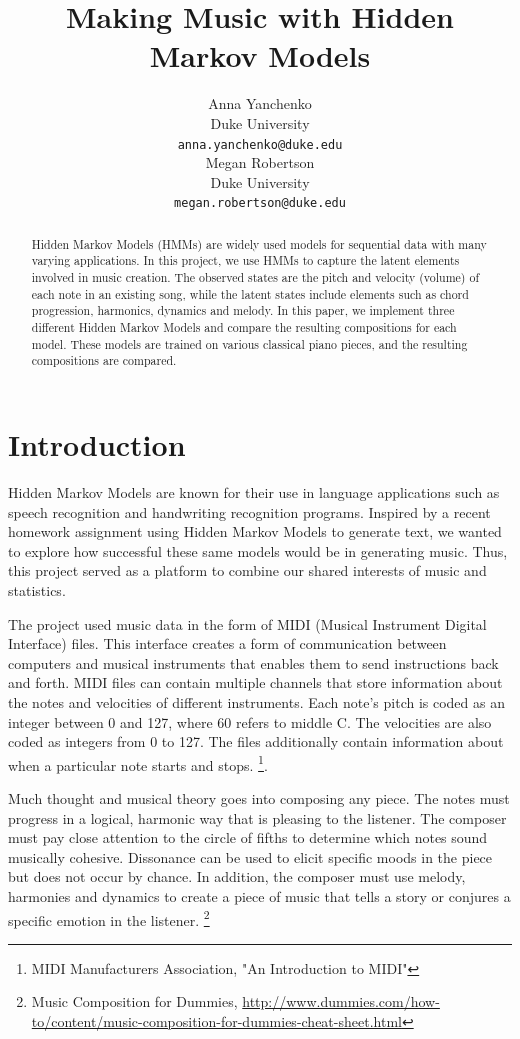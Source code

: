 \documentclass{article} %
\title{Making Music with Hidden Markov Models}
\author{
Anna Yanchenko \\
Duke University\\
\texttt{anna.yanchenko@duke.edu} \\
\And
Megan Robertson \\
Duke University \\
\texttt{megan.robertson@duke.edu} \\
}
\begin{document}
\maketitle

\begin{abstract}
Hidden Markov Models (HMMs) are widely used models for sequential data with many varying applications.  In this project, we use HMMs to capture the latent elements involved in music creation. The observed states are the pitch and velocity (volume) of each note in an existing  song, while the latent states include elements such as chord progression, harmonics, dynamics and melody.  In this paper, we implement three different Hidden Markov Models and compare the resulting compositions for each model. These models are trained on various classical piano pieces, and the resulting compositions are compared.
\end{abstract}
 
\section{Introduction}

Hidden Markov Models are known for their use in language applications such as speech recognition and handwriting recognition programs. Inspired by a recent homework assignment using Hidden Markov Models to generate text, we wanted to explore how successful these same models would be in generating music. Thus, this project served as a platform to combine our shared interests of music and statistics. 

The project used music data in the form of MIDI (Musical Instrument Digital Interface) files. This interface creates a form of communication between computers and musical instruments that enables them to send instructions back and forth. MIDI files can contain multiple channels that store information about the notes and velocities of different instruments.   Each note's pitch is coded as an integer between 0 and 127, where 60 refers to middle C.  The velocities are also coded as integers from 0 to 127. The files additionally contain information about when a particular note starts and stops. \footnote{MIDI Manufacturers Association, "An Introduction to MIDI"}. 


Much thought and musical theory goes into composing any piece.  The notes must progress in a logical, harmonic way that is pleasing to the listener. The composer must pay close attention to the circle of fifths to determine which notes sound musically cohesive.  Dissonance can be used to elicit specific moods in the piece but does not occur by chance.  In addition, the composer must use melody, harmonies and dynamics to create a piece of music that tells a story or conjures a specific emotion in the listener.  
\footnote{Music Composition for Dummies, \url{http://www.dummies.com/how-to/content/music-composition-for-dummies-cheat-sheet.html}}
\end{document}
